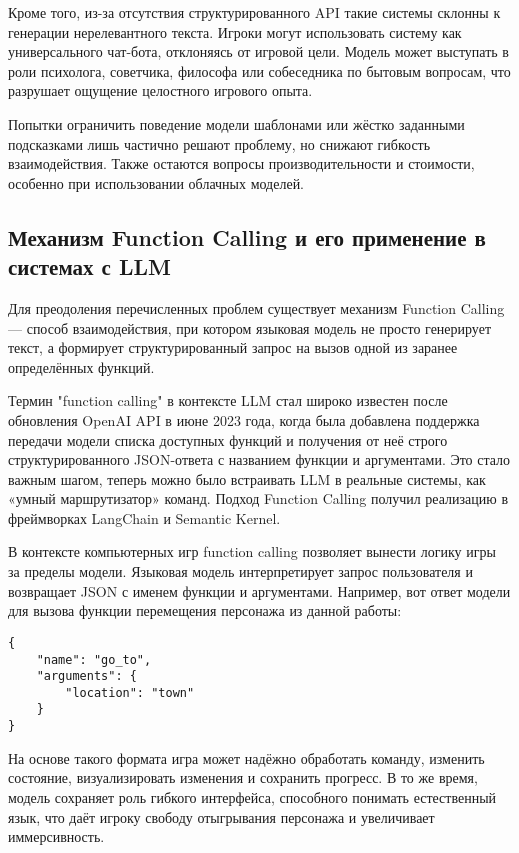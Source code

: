 \documentclass[14pt]{extarticle}
\begin{document}
Кроме того, из-за отсутствия структурированного API такие системы склонны к генерации нерелевантного текста. Игроки могут использовать систему как универсального чат-бота, отклоняясь от игровой цели. Модель может выступать в роли психолога, советчика, философа или собеседника по бытовым вопросам, что разрушает ощущение целостного игрового опыта.

Попытки ограничить поведение модели шаблонами или жёстко заданными подсказками лишь частично решают проблему, но снижают гибкость взаимодействия. Также остаются вопросы производительности и стоимости, особенно при использовании облачных моделей.

\subsection{Механизм Function Calling и его применение в системах с LLM}

Для преодоления перечисленных проблем существует механизм Function Calling --- способ взаимодействия, при котором языковая модель не просто генерирует текст, а формирует структурированный запрос на вызов одной из заранее определённых функций.

Термин "function calling" в контексте LLM стал широко известен после обновления OpenAI API в июне 2023 года, когда была добавлена поддержка передачи модели списка доступных функций и получения от неё строго структурированного JSON-ответа с названием функции и аргументами. Это стало важным шагом, теперь можно было встраивать LLM в реальные системы, как «умный маршрутизатор» команд. Подход Function Calling получил реализацию в фреймворках LangChain и Semantic Kernel.

В контексте компьютерных игр function calling позволяет вынести логику игры за пределы модели. Языковая модель интерпретирует запрос пользователя и возвращает JSON с именем функции и аргументами. Например, вот ответ модели для вызова функции перемещения персонажа из данной работы:

\begin{verbatim}
{
    "name": "go_to",
    "arguments": {
        "location": "town"
    }
}
\end{verbatim}

На основе такого формата игра может надёжно обработать команду, изменить состояние, визуализировать изменения и сохранить прогресс. В то же время, модель сохраняет роль гибкого интерфейса, способного понимать естественный язык, что даёт игроку свободу отыгрывания персонажа и увеличивает иммерсивность.
\end{document}
